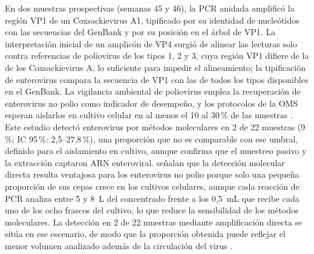 En dos muestras prospectivas (semanas 45 y 46), la PCR anidada amplificó la región VP1 de un Coxsackievirus A1, tipificado por su identidad de nucleótidos con las secuencias del GenBank y por su posición en el árbol de VP1. La interpretación inicial de un amplicón de VP4 surgió de alinear las lecturas solo contra referencias de poliovirus de los tipos 1, 2 y 3, cuya región VP1 difiere de la de los Coxsackievirus A, lo suficiente para impedir el alineamiento; la tipificación de enterovirus compara la secuencia de VP1 con las de todos los tipos disponibles en el GenBank. La vigilancia ambiental de poliovirus emplea la recuperación de enterovirus no polio como indicador de desempeño, y los protocolos de la OMS esperan aislarlos en cultivo celular en al menos el 10 al 30\,\% de las muestras \cite{OReilly_2020}. Este estudio detectó enterovirus por métodos moleculares en 2 de 22 muestras (9\,\%; IC 95\,\%: 2,5--27,8\,\%), una proporción que no es comparable con ese umbral, definido para el aislamiento en cultivo, aunque confirma que el muestreo pasivo y la extracción captaron ARN enteroviral.  señalan que la detección molecular directa resulta ventajosa para los enterovirus no polio porque solo una pequeña proporción de sus cepas crece en los cultivos celulares, aunque cada reacción de PCR analiza entre 5 y 8~\textmu L del concentrado frente a los 0,5~mL que recibe cada uno de los ocho frascos del cultivo, lo que reduce la sensibilidad de los métodos moleculares. La detección en 2 de 22 muestras mediante amplificación directa se sitúa en ese escenario, de modo que la proporción obtenida puede reflejar el menor volumen analizado además de la circulación del virus \cite{Martin_2016}.

